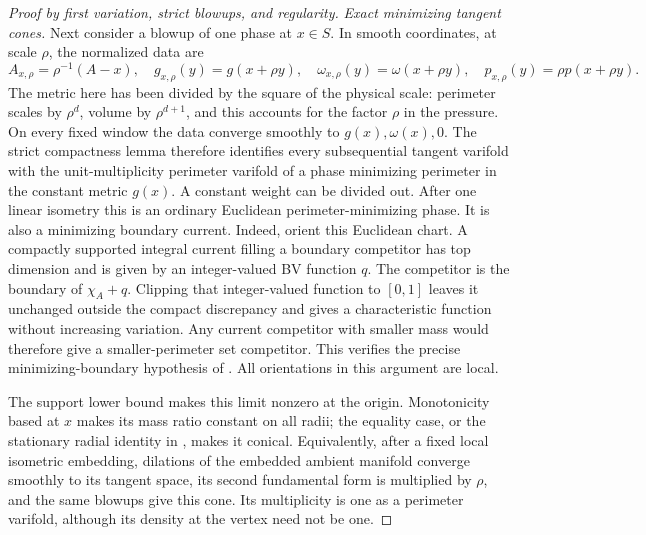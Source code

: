 \documentclass[11pt]{article}
\numberwithin{equation}{section}
\theoremstyle{definition}
\theoremstyle{remark}
\begin{document}
\begin{proof}[Proof by first variation, strict blowups, and regularity]
\emph{Exact minimizing tangent cones.}
Next consider a blowup of one phase at $x\in S$.  In smooth coordinates,
at scale $\rho$, the normalized data are
\[
 A_{x,\rho}=\rho^{-1}(A-x),\quad
 g_{x,\rho}(y)=g(x+\rho y),\quad
 \omega_{x,\rho}(y)=\omega(x+\rho y),\quad
 p_{x,\rho}(y)=\rho p(x+\rho y).
\]
The metric here has been divided by the square of the physical scale:
perimeter scales by $\rho^d$, volume by $\rho^{d+1}$, and this accounts
for the factor $\rho$ in the pressure.  On every fixed window the data
converge smoothly to $g(x),\omega(x),0$.  The strict compactness lemma
therefore identifies every subsequential tangent varifold with the
unit-multiplicity perimeter varifold of a phase minimizing perimeter
in the constant metric $g(x)$.  A constant weight can be divided out.
After one linear isometry this is an ordinary Euclidean
perimeter-minimizing phase.  It is also a minimizing boundary current.
Indeed, orient this Euclidean chart.  A compactly supported integral
current filling a boundary competitor has top dimension and is given
by an integer-valued BV function $q$.  The competitor is the boundary
of $\chi_A+q$.  Clipping that integer-valued function to $[0,1]$ leaves
it unchanged outside the compact discrepancy and gives a characteristic
function without increasing variation.  Any current competitor with
smaller mass would therefore give a smaller-perimeter set competitor.
This verifies the precise minimizing-boundary hypothesis of
\citet[Chapter~7, Theorem~5.8]{simonGMT}.  All orientations in this
argument are local.

The support lower bound makes this limit nonzero at the origin.
Monotonicity based at $x$ makes its mass ratio constant on all radii;
the equality case, or the stationary radial identity in
\citet[Chapter~4, Equation~(3.6)]{simonGMT}, makes it conical.
Equivalently, after a fixed local isometric embedding, dilations of
the embedded ambient manifold converge smoothly to its tangent
space, its second fundamental form is multiplied by $\rho$, and
the same blowups give this cone.  Its multiplicity is one as a
perimeter varifold, although its density at the vertex need not
be one.


\end{proof}
\end{document}
